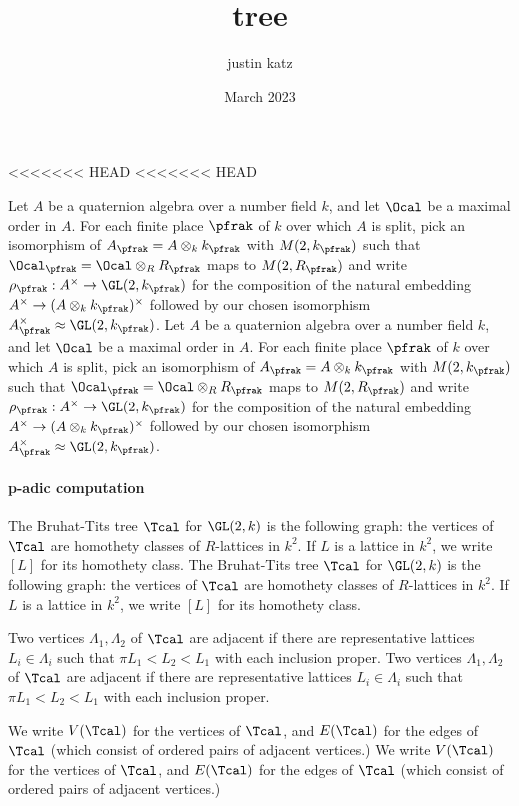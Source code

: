 \documentclass[draft]{amsart}
\title{tree}
\author{justin katz}
\date{March 2023}
\begin{document}
<<<<<<< HEAD
<<<<<<< HEAD

Let $A$ be a quaternion algebra over a number field $k$, and let $\Ocal$ be a maximal order in $A$. For each finite place $\pfrak$ of $k$ over which $A$ is split, pick an isomorphism of $A_\pfrak =A\otimes_k k_\pfrak$ with $M(2,k_\pfrak)$ such that $\Ocal_\pfrak = \Ocal \otimes_R R_\pfrak$ maps to $M(2,R_\pfrak)$ and write $\rho_\pfrak:A^\times \to \GL(2,k_\pfrak)$ for the composition of the natural embedding $A^\times \to (A\otimes_k k_\pfrak)^\times$ followed by our chosen isomorphism $A_\pfrak^\times \approx \GL(2,k_\pfrak)$.
Let $A$ be a quaternion algebra over a number field $k$, and let $\Ocal$ be a maximal order in $A$. For each finite place $\pfrak$ of $k$ over which $A$ is split, pick an isomorphism of $A_\pfrak =A\otimes_k k_\pfrak$ with $M(2,k_\pfrak)$ such that $\Ocal_\pfrak = \Ocal \otimes_R R_\pfrak$ maps to $M(2,R_\pfrak)$ and write $\rho_\pfrak:A^\times \to \GL(2,k_\pfrak)$ for the composition of the natural embedding $A^\times \to (A\otimes_k k_\pfrak)^\times$ followed by our chosen isomorphism $A_\pfrak^\times \approx \GL(2,k_\pfrak)$.

\paragraph*{p-adic computation}
\begin{definition}
    The Bruhat-Tits tree $\Tcal$ for $\GL(2,k)$ is the following graph: the vertices of $\Tcal$ are homothety classes of $R$-lattices in $k^2$.
    If $L$ is a lattice in $k^2$, we write $[L]$ for its homothety class.
    The Bruhat-Tits tree $\Tcal$ for $\GL(2,k)$ is the following graph: the vertices of $\Tcal$ are homothety classes of $R$-lattices in $k^2$.
    If $L$ is a lattice in $k^2$, we write $[L]$ for its homothety class.

    Two vertices $\Lambda_1,\Lambda_2 $ of $\Tcal$ are adjacent if there are representative lattices $L_i \in \Lambda_i$ such that $\pi L_1 < L_2 < L_1$ with each inclusion proper.
    Two vertices $\Lambda_1,\Lambda_2 $ of $\Tcal$ are adjacent if there are representative lattices $L_i \in \Lambda_i$ such that $\pi L_1 < L_2 < L_1$ with each inclusion proper.

    We write $V(\Tcal)$ for the vertices of $\Tcal$, and $E(\Tcal)$ for the edges of $\Tcal$ (which consist of ordered pairs of adjacent vertices.)
    We write $V(\Tcal)$ for the vertices of $\Tcal$, and $E(\Tcal)$ for the edges of $\Tcal$ (which consist of ordered pairs of adjacent vertices.)
\end{definition}
\end{document}
